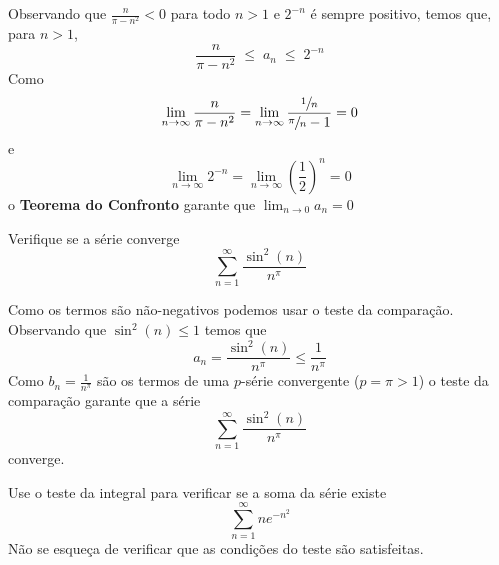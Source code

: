 \documentclass[a4paper,12pt,fleqn]{article}
\begin{document}
\begin{answer}
  Observando que
  \(\frac{n}{\pi-n^2}<0\) para todo \(n>1\) e
  \(2^{-n}\) é sempre positivo, temos que, para \(n>1\),
  \[
    \frac{n}{\pi-n^2} \;\leq\; a_n \;\leq\; 2^{-n}
  \]
  Como
  \[
    \lim_{n\to\infty} \frac{n}{\pi-n^2}
    = \lim_{n\to\infty} \frac{\sfrac{1}{n}}{\sfrac{\pi}{n}-1}
    = 0
  \]
  e
  \[
    \lim_{n\to\infty} 2^{-n}
    = \lim_{n\to\infty} \left(\frac{1}{2}\right)^n
    = 0
  \]
  o \textbf{Teorema do Confronto} garante que \(\lim_{n\to 0} a_n = 0\)
\end{answer}

Verifique se a série converge
\[
  \sum_{n=1}^\infty \frac{\sin^2(n)}{n^\pi}
\]

\begin{answer}
  Como os termos são não-negativos podemos usar o teste da comparação.
  Observando que
  \(
    \sin^2(n) \leq 1
  \)
  temos que
  \[
    a_n = \frac{\sin^2(n)}{n^\pi} \leq \frac{1}{n^\pi}
  \]
  Como \(b_n = \frac{1}{n^\pi} \) são os termos de uma $p$-série convergente
  (\(p=\pi>1\))
  o teste da comparação garante que a série
  \[
    \sum_{n=1}^\infty \frac{\sin^2(n)}{n^\pi}
  \]
  converge.
\end{answer}

Use o teste da integral para verificar se a soma da série existe
\[
  \sum_{n=1}^{\infty} n e^{-n^2}
\]
Não se esqueça de verificar que as condições do teste são satisfeitas.
\end{document}
